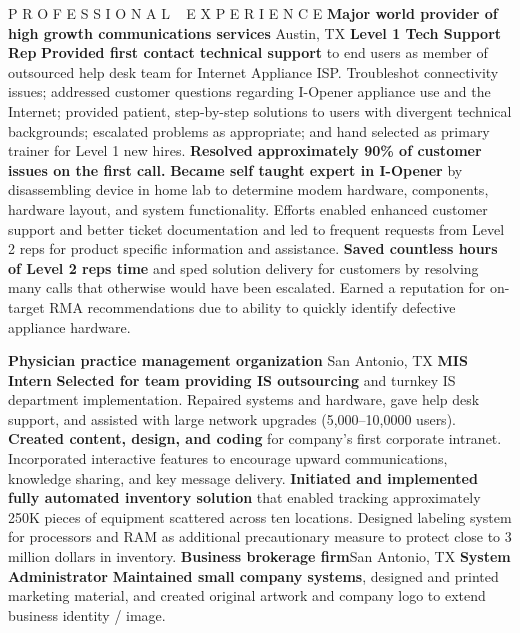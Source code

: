 \begin{rubric}{P R O F E S S I O N A L ~ E X P E R I E N C E}
		\entry*\textbf{Major world provider of high growth communications services} Austin, TX
			\textbf{Level 1 Tech Support Rep}
		\entry*\textbf{Provided first contact technical support} to end users as member of outsourced help desk team for Internet Appliance ISP.  Troubleshot connectivity issues; addressed customer questions regarding I-Opener appliance use and the Internet; provided patient, step-by-step solutions to users with divergent technical backgrounds; escalated problems as appropriate; and hand selected as primary trainer for Level 1 new hires.
		\entry*\textbf{Resolved approximately 90\% of customer issues on the first call.}
		\entry*\textbf{Became self taught expert in I-Opener} by disassembling device in home lab to determine modem hardware, components, hardware layout, and system functionality. Efforts enabled enhanced customer support and better ticket documentation and led to frequent requests from Level 2 reps for product specific information and assistance.
		\entry*\textbf{Saved countless hours of Level 2 reps time} and sped solution delivery for customers by resolving many calls that otherwise would have been escalated.  Earned a reputation for on-target RMA recommendations due to ability to quickly identify defective appliance hardware.

		\entry*\textbf{Physician practice management organization} San Antonio, TX
			\textbf{MIS Intern}
		\entry*\textbf{Selected for team providing IS outsourcing} and turnkey IS department implementation.  Repaired systems and hardware, gave help desk support, and assisted with large network upgrades (5,000--10,0000 users).
		\entry*\textbf{Created content, design, and coding} for company's first corporate intranet.  Incorporated interactive features to encourage upward communications, knowledge sharing, and key message delivery.
		\entry*\textbf{Initiated and implemented fully automated inventory solution} that enabled tracking approximately 250K pieces of equipment scattered across ten locations.  Designed labeling system for processors and RAM as additional precautionary measure to protect close to 3 million dollars in inventory.
		\entry*\textbf{Business brokerage firm}San Antonio, TX
			\textbf{System Administrator}
		\entry*\textbf{Maintained small company systems}, designed and printed marketing material, and created original artwork and company logo to extend business identity / image.

\end{rubric}
